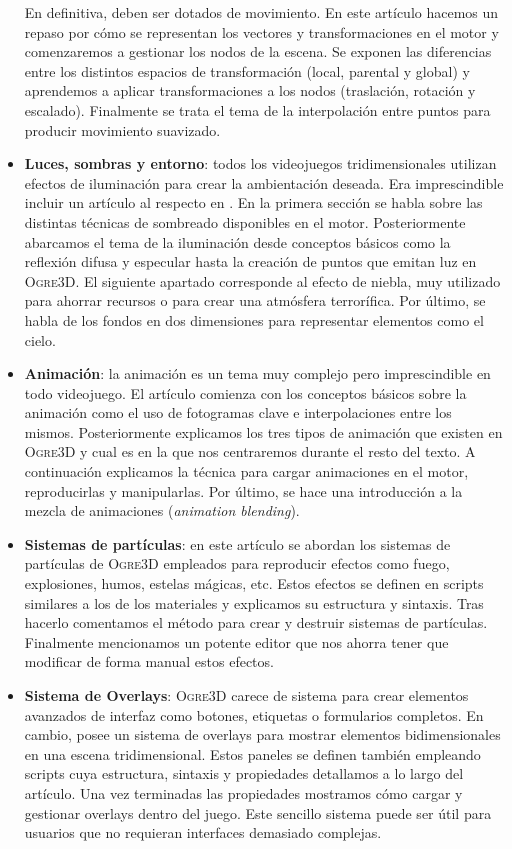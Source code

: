 \begin{itemize}
    En definitiva, deben ser dotados de movimiento. En este artículo
    hacemos un repaso por cómo se representan los vectores y transformaciones
    en el motor y comenzaremos a gestionar los nodos de la escena. Se
    exponen las diferencias entre los distintos espacios de transformación
    (local, parental y global) y aprendemos a aplicar transformaciones
    a los nodos (traslación, rotación y escalado). Finalmente se trata el tema
    de la interpolación entre puntos para producir movimiento suavizado.
    \item \textbf{Luces, sombras y entorno}: todos los videojuegos tridimensionales
    utilizan efectos de iluminación para crear la ambientación deseada.
    Era imprescindible incluir un artículo al respecto en \wiki. En la primera
    sección se habla sobre las distintas técnicas de sombreado disponibles
    en el motor. Posteriormente abarcamos el tema de la iluminación
    desde conceptos básicos como la reflexión difusa y especular hasta
    la creación de puntos que emitan luz en \textsc{Ogre3D}. El siguiente
    apartado corresponde al efecto de niebla, muy utilizado para ahorrar
    recursos o para crear una atmósfera terrorífica. Por último, se habla
    de los fondos en dos dimensiones para representar elementos como el cielo.
    \item \textbf{Animación}: la animación es un tema muy complejo pero imprescindible
    en todo videojuego. El artículo comienza con los conceptos básicos sobre
    la animación como el uso de fotogramas clave e interpolaciones entre los mismos. 
    Posteriormente explicamos los tres tipos de animación que existen en
    \textsc{Ogre3D} y cual es en la que nos centraremos durante el resto
    del texto. A continuación explicamos la técnica para cargar animaciones
    en el motor, reproducirlas y manipularlas. Por último, se hace una introducción
    a la mezcla de animaciones (\textit{animation blending}).
    \item \textbf{Sistemas de partículas}: en este artículo se abordan
    los sistemas de partículas de \textsc{Ogre3D} empleados para reproducir
    efectos como fuego, explosiones, humos, estelas mágicas, etc. Estos
    efectos se definen en scripts similares a los de los materiales y explicamos
    su estructura y sintaxis. Tras hacerlo comentamos el método para crear
    y destruir sistemas de partículas. Finalmente mencionamos un potente
    editor que nos ahorra tener que modificar de forma manual estos efectos.
    \item \textbf{Sistema de Overlays}: \textsc{Ogre3D} carece de sistema
    para crear elementos avanzados de interfaz como botones, etiquetas o
    formularios completos. En cambio, posee un sistema de overlays para mostrar
    elementos bidimensionales en una escena tridimensional. Estos paneles
    se definen también empleando scripts cuya estructura, sintaxis y propiedades
    detallamos a lo largo del artículo. Una vez terminadas las propiedades
    mostramos cómo cargar y gestionar overlays dentro del juego. Este sencillo
    sistema puede ser útil para usuarios que no requieran interfaces demasiado
    complejas.
\end{itemize}

